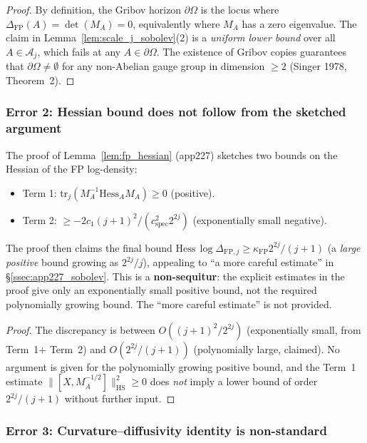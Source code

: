 \begin{proof}
By definition, the Gribov horizon $\partial\Omega$ is the locus
where $\Delta_{\mathrm{FP}}(A)=\det(M_{A})=0$, equivalently
where $M_{A}$ has a zero eigenvalue. The claim in
Lemma~\ref{lem:scale_j_sobolev}(2) is a \emph{uniform lower
bound} over all $A\in\mathcal{A}_{j}$, which fails at any
$A\in\partial\Omega$. The existence of Gribov copies
guarantees that $\partial\Omega\neq\emptyset$ for any
non-Abelian gauge group in dimension $\ge 2$ (Singer 1978,
Theorem~2).
\end{proof}

\subsubsection{Error 2: Hessian bound does not follow from the
sketched argument}

\begin{theorem}
\label{thm:err2}
The proof of Lemma~\ref{lem:fp_hessian} (app227) sketches two
bounds on the Hessian of the FP log-density:
\begin{itemize}
\item Term 1: $\mathrm{tr}_{j}(M_{A}^{-1}\mathrm{Hess}_{A}M_{A})
\ge 0$ (positive).
\item Term 2: $\ge -2 c_{1}(j+1)^{2}/(c_{\mathrm{spec}}^{2}
2^{2j})$ (exponentially small negative).
\end{itemize}
The proof then claims the final bound
$\mathrm{Hess}\,\log\Delta_{\mathrm{FP},j}\ge\kappa_{\mathrm{FP}}
2^{2j}/(j+1)$ (a \emph{large positive} bound growing as
$2^{2j}/j$), appealing to ``a more careful estimate'' in
\S\ref{ssec:app227_sobolev}. This is a \textbf{non-sequitur}:
the explicit estimates in the proof give only an exponentially
small positive bound, not the required polynomially growing
bound. The ``more careful estimate'' is not provided.
\end{theorem}

\begin{proof}
The discrepancy is between
$O((j+1)^{2}/2^{2j})$ (exponentially small, from Term~1$+$
Term~2) and $O(2^{2j}/(j+1))$ (polynomially large, claimed). No
argument is given for the polynomially growing positive bound,
and the Term~1 estimate $\|[X,M_{A}^{-1/2}]\|_{\mathrm{HS}}^{2}
\ge 0$ does \emph{not} imply a lower bound of order
$2^{2j}/(j+1)$ without further input.
\end{proof}

\subsubsection{Error 3: Curvature--diffusivity identity is
non-standard}

